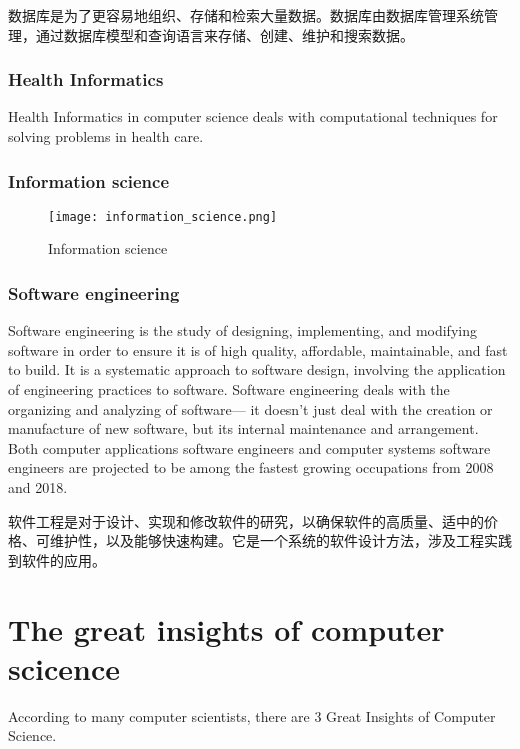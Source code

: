 数据库是为了更容易地组织、存储和检索大量数据。数据库由数据库管理系统管理，通过数据库模型和查询语言来存储、创建、维护和搜索数据。


\subsection{Health Informatics}

Health Informatics in computer science deals with computational techniques for solving problems in health care.




\subsection{Information science}


\begin{figure}[!h]
\centering
\texttt{[image: information\_science.png]}
\caption{Information science}
\label{information_science}
\end{figure}



\subsection{Software engineering}

Software engineering is the study of designing, implementing, and modifying software in order to ensure it is of high quality, affordable, maintainable, and fast to build. It is a systematic approach to software design, involving the application of engineering practices to software. Software engineering deals with the organizing and analyzing of software— it doesn't just deal with the creation or manufacture of new software, but its internal maintenance and arrangement. Both computer applications software engineers and computer systems software engineers are projected to be among the fastest growing occupations from 2008 and 2018.

软件工程是对于设计、实现和修改软件的研究，以确保软件的高质量、适中的价格、可维护性，以及能够快速构建。它是一个系统的软件设计方法，涉及工程实践到软件的应用。


\chapter{The great insights of computer scicence}

According to many computer scientists, there are 3 Great Insights of Computer Science.

